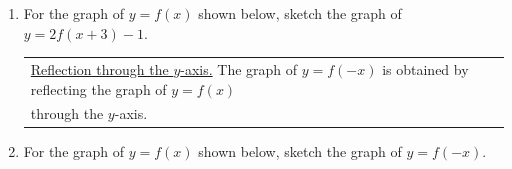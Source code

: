 \documentclass[11pt]{article}
\begin{document}
\begin{enumerate}
\newpage
\item For the graph of $y=f(x)$ shown below, sketch the graph of $y=2f(x+3)-1$. \\
%
%
%
%



\begin{tabular}{| l |} \hline \underline{Reflection through the $y$-axis.} The graph of $y=f(-x)$ is obtained by reflecting the graph of $y=f(x)$ \\ through the $y$-axis.
 \\ \hline
\end{tabular} 

\vspace{-.1in}
\item For the graph of $y=f(x)$ shown below, sketch the graph of $y=f(-x)$.\\







\end{enumerate}
\end{document}
